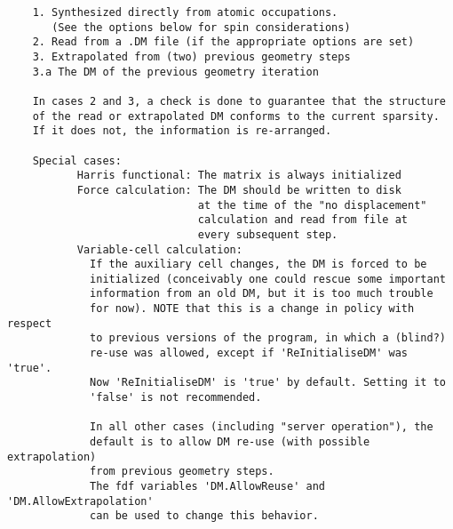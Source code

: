 \documentclass[11pt]{article}
\begin{document}
\begin{verbatim}
    1. Synthesized directly from atomic occupations.
       (See the options below for spin considerations)
    2. Read from a .DM file (if the appropriate options are set)
    3. Extrapolated from (two) previous geometry steps
    3.a The DM of the previous geometry iteration

    In cases 2 and 3, a check is done to guarantee that the structure
    of the read or extrapolated DM conforms to the current sparsity.
    If it does not, the information is re-arranged.

    Special cases:
           Harris functional: The matrix is always initialized
           Force calculation: The DM should be written to disk
                              at the time of the "no displacement"
                              calculation and read from file at
                              every subsequent step.
           Variable-cell calculation:
             If the auxiliary cell changes, the DM is forced to be
             initialized (conceivably one could rescue some important
             information from an old DM, but it is too much trouble
             for now). NOTE that this is a change in policy with respect
             to previous versions of the program, in which a (blind?)
             re-use was allowed, except if 'ReInitialiseDM' was 'true'.
             Now 'ReInitialiseDM' is 'true' by default. Setting it to
             'false' is not recommended.

             In all other cases (including "server operation"), the
             default is to allow DM re-use (with possible extrapolation)
             from previous geometry steps.
             The fdf variables 'DM.AllowReuse' and 'DM.AllowExtrapolation'
             can be used to change this behavior.

\end{verbatim}
\end{document}
